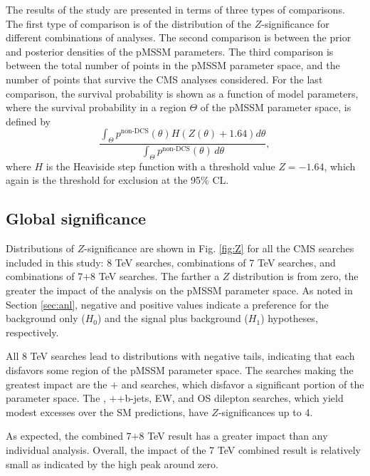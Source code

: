 The results of the study are presented in terms of three types of comparisons. The first type of comparison is of the distribution of the $Z$-significance for different combinations of analyses.
The second comparison is between the prior and posterior densities of the pMSSM parameters.
The third comparison is between the total number of points in the pMSSM parameter space, and the number of points that survive the CMS analyses considered. For the last comparison, the survival probability is shown as a function of model parameters, where the survival probability in a region $\Theta$ of the pMSSM parameter space, is defined by
\begin{equation}
  \frac{\int_\Theta p^\textrm{non-DCS}(\theta)H(Z(\theta) + 1.64)d\theta}{\int_\Theta p^\textrm{non-DCS}(\theta) \, d\theta},
  \label{eq:Survive}
\end{equation}
where $H$ is the Heaviside step function with a threshold value $Z = -1.64$, which
again is the threshold for exclusion at the 95\% CL. 

\subsection{Global significance}
Distributions of $Z$-significance are shown in Fig. \ref{fig:Z} for all the CMS
searches included in this study: 8 TeV searches, combinations of 7 TeV searches, and combinations of
7$+$8 TeV searches. The farther a $Z$ distribution is from zero, the
greater the impact of the analysis on the pMSSM parameter space.   As
noted in Section \ref{sec:anl}, negative and positive values indicate a preference for the background only ($H_0$) and the signal plus background ($H_1$) hypotheses, respectively.

All 8 TeV searches lead to distributions with negative tails,
indicating that each disfavors some region of the pMSSM parameter space.
The searches making the greatest impact are the \HT{}$+$\MHT{} and \MTtwo{}
searches, which disfavor a significant portion of the parameter space.
The \MTtwo{}, \HT{}$+$\MET{}$+$b-jets, EW, and OS dilepton searches,
which yield modest excesses over the SM predictions, have
$Z$-significances up to 4.

As expected, the combined 7$+$8 TeV result has a greater impact than any individual analysis. 
Overall, the impact of the 7 TeV combined result is relatively small as indicated by the high peak around zero. 


